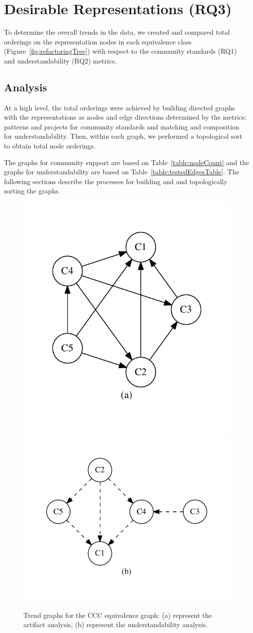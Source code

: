 

\section{Desirable Representations (RQ3)}
\label{sec:rq3}
To determine the overall trends in the data, we created and compared total orderings on the representation nodes in each equivalence class (Figure~\ref{fig:refactoringTree})  with respect to the community standards (RQ1)  and understandability (RQ2) metrics.

\subsection{Analysis}
At a high level, the total orderings were achieved by building directed graphs with the representations as nodes and edge directions determined by the metrics: patterns and projects for community standards and matching and composition for understandability. Then, within each graph, we performed a topological sort to obtain total node orderings.

The graphs for community support are based on Table~\ref{table:nodeCount} and the graphs for understandability are based on Table~\ref{table:testedEdgesTable}. The following sections describe the processes for building and and topologically sorting the graphs. 

\begin{figure}[tb]
\centering
\includegraphics[width=0.42\columnwidth]{graphs/cart.pdf}\includegraphics[width=0.57\columnwidth]{graphs/ccom.pdf}
\vspace{-12pt}
\caption{Trend graphs for the CCC equivalence graph: (a) represent the artifact analysis, (b) represent the understandability analysis.}

\label{fig:graphsforanalysis}
\end{figure}


